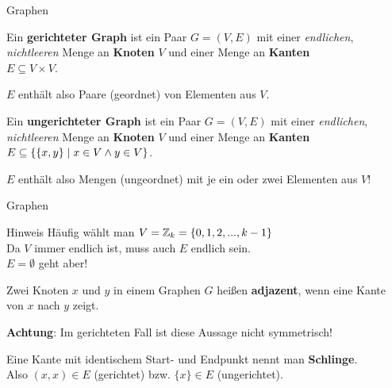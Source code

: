 \begin{frame}{Graphen}
	\begin{Definition}
		Ein \textbf{gerichteter Graph} ist ein Paar $G = (V, E)$ mit einer \emph{endlichen}, \emph{nichtleeren} Menge an \textbf{Knoten} $V$ und einer Menge an \textbf{Kanten}\\
		$E \subseteq V \times V$.
	\end{Definition} \pause
	$E$ enthält also Paare (geordnet) von Elementen aus $V$. \pause
	
	\bigskip
	\begin{Definition}
		Ein \textbf{ungerichteter Graph} ist ein Paar $G = (V, E)$ mit einer \emph{endlichen}, \emph{nichtleeren} Menge an \textbf{Knoten} $V$ und einer Menge an \textbf{Kanten}\\
		$E \subseteq \left\{ \{x,y\} \;\middle|\; x \in V \land y \in V \right\}$.
	\end{Definition} \pause
	$E$ enthält also Mengen (ungeordnet) mit je ein oder zwei Elementen aus $V$!
\end{frame}

\begin{frame}{Graphen}
	\begin{block}{Hinweis}
		Häufig wählt man $V = \mathbb{Z}_k = \{0,1,2,...,k-1\}$\\
		
		Da $V$ immer endlich ist, muss auch $E$ endlich sein.\\
		$E = \emptyset$ geht aber!
	\end{block}

	\pause
	\begin{Definition}
		Zwei Knoten $x$ und $y$ in einem Graphen $G$ heißen \textbf{adjazent}, wenn eine Kante von $x$ nach $y$ zeigt.
	\end{Definition}
	\textbf{Achtung}: Im gerichteten Fall ist diese Aussage nicht symmetrisch!

	\pause
	\begin{Definition}
		Eine Kante mit identischem Start- und Endpunkt nennt man \textbf{Schlinge}.\\
		Also $(x,x) \in E$ (gerichtet) bzw. $\{x\} \in E$ (ungerichtet).\\
	\end{Definition}
\end{frame}

